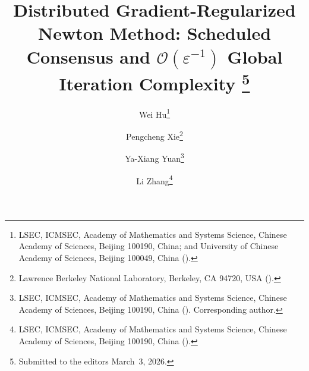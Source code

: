 \newcommand{\creflastconjunction}{, and~}




\title{Distributed Gradient-Regularized Newton Method:
	Scheduled Consensus and \texorpdfstring{$\mathcal{O}(\varepsilon^{-1})$}{O(eps\^{}-1)} Global Iteration Complexity%
	\thanks{Submitted to the editors March~3, 2026.
		}}

\author{
	Wei Hu\thanks{
		LSEC, ICMSEC, Academy of Mathematics and Systems Science,
		Chinese Academy of Sciences, Beijing 100190, China;
		and University of Chinese Academy of Sciences, Beijing 100049, China
		().
	}
	\and
	Pengcheng Xie\thanks{
		Lawrence Berkeley National Laboratory,
		Berkeley, CA 94720, USA
		().
	}
	\and
	Ya-Xiang Yuan\thanks{
		LSEC, ICMSEC, Academy of Mathematics and Systems Science,
		Chinese Academy of Sciences, Beijing 100190, China
		().
		Corresponding author.
	}
	\and
	Li Zhang\thanks{
		LSEC, ICMSEC, Academy of Mathematics and Systems Science,
		Chinese Academy of Sciences, Beijing 100190, China
		().
	}
}

